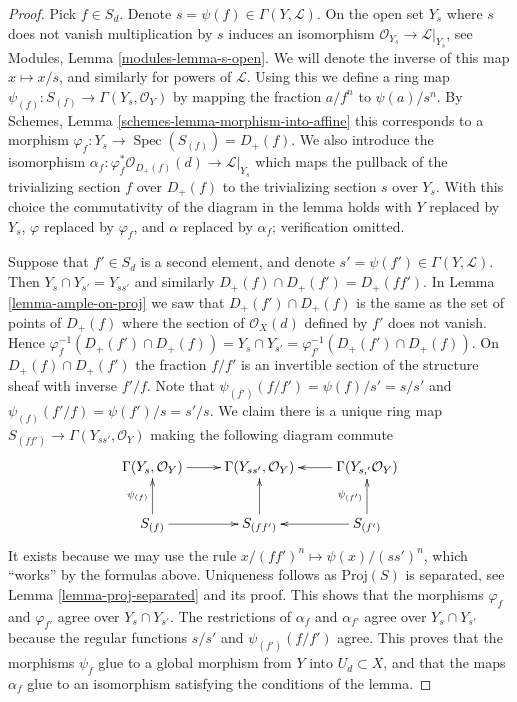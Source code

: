 \documentclass{stacks-project}
\theoremstyle{plain}
\theoremstyle{definition}
\theoremstyle{remark}
\numberwithin{equation}{subsection}
\def\Spec{\mathop{\mathrm{Spec}}}
\begin{document}
\begin{proof}
Pick $f \in S_d$. Denote $s = \psi(f) \in \Gamma(Y, \mathcal{L})$.
On the open set $Y_s$ where $s$ does not vanish multiplication
by $s$ induces an isomorphism $\mathcal{O}_{Y_s} \to \mathcal{L}|_{Y_s}$,
see Modules, Lemma \ref{modules-lemma-s-open}. We will denote
the inverse of this map $x \mapsto x/s$, and similarly for
powers of $\mathcal{L}$. Using this we
define a ring map $\psi_{(f)} : S_{(f)} \to \Gamma(Y_s, \mathcal{O}_Y)$
by mapping the fraction $a/f^n$ to $\psi(a)/s^n$.
By Schemes, Lemma \ref{schemes-lemma-morphism-into-affine}
this corresponds to a morphism
$\varphi_f : Y_s \to \Spec(S_{(f)}) = D_{+}(f)$.
We also introduce the isomorphism
$\alpha_f : \varphi_f^*\mathcal{O}_{D_{+}(f)}(d) \to \mathcal{L}|_{Y_s}$
which maps the pullback of the trivializing section
$f$ over $D_{+}(f)$ to the trivializing section $s$ over $Y_s$.
With this choice the commutativity of the diagram in the lemma
holds with $Y$ replaced by $Y_s$, $\varphi$ replaced by $\varphi_f$,
and $\alpha$ replaced by $\alpha_f$; verification omitted.

\medskip\noindent
Suppose that $f' \in S_d$ is a second element, and denote
$s' = \psi(f') \in \Gamma(Y, \mathcal{L})$. Then
$Y_s \cap Y_{s'} = Y_{ss'}$ and similarly
$D_{+}(f) \cap D_{+}(f') = D_{+}(ff')$.
In Lemma \ref{lemma-ample-on-proj} we saw that
$D_{+}(f') \cap D_{+}(f)$ is the same as the set
of points of $D_{+}(f)$ where the section of
$\mathcal{O}_X(d)$ defined by $f'$ does not vanish.
Hence
$\varphi_f^{-1}(D_{+}(f') \cap D_{+}(f)) = Y_s \cap Y_{s'}
= \varphi_{f'}^{-1}(D_{+}(f') \cap D_{+}(f))$.
On $D_{+}(f) \cap D_{+}(f')$ the fraction $f/f'$ is an
invertible section of the structure sheaf with inverse
$f'/f$. Note that $\psi_{(f')}(f/f') = \psi(f)/s' = s/s'$
and $\psi_{(f)}(f'/f) = \psi(f')/s = s'/s$. We claim there
is a unique ring map
$S_{(ff')} \to \Gamma(Y_{ss'}, \mathcal{O}_Y)$ making the
following diagram commute
$$
\xymatrix{
\Gamma(Y_s, \mathcal{O}_Y) \ar[r] &
\Gamma(Y_{ss'}, \mathcal{O}_Y) &
\Gamma(Y_{s, '} \mathcal{O}_Y) \ar[l]\\
S_{(f)} \ar[r] \ar[u]^{\psi_{(f)}} &
S_{(ff')} \ar[u] &
S_{(f')} \ar[l] \ar[u]^{\psi_{(f')}}
}
$$
It exists because we may use the rule
$x/(ff')^n \mapsto \psi(x)/(ss')^n$, which ``works'' by the formulas
above. Uniqueness follows as $\text{Proj}(S)$ is separated, see
Lemma \ref{lemma-proj-separated} and its proof. This shows that the
morphisms $\varphi_f$ and $\varphi_{f'}$ agree over $Y_s \cap Y_{s'}$.
The restrictions of $\alpha_f$ and $\alpha_{f'}$ agree over
$Y_s \cap Y_{s'}$ because the regular functions $s/s'$ and
$\psi_{(f')}(f/f')$ agree. This proves that the morphisms $\psi_f$
glue to a global morphism from $Y$ into $U_d \subset X$, and
that the maps $\alpha_f$ glue to an isomorphism satisfying the
conditions of the lemma.


\end{proof}
\end{document}
